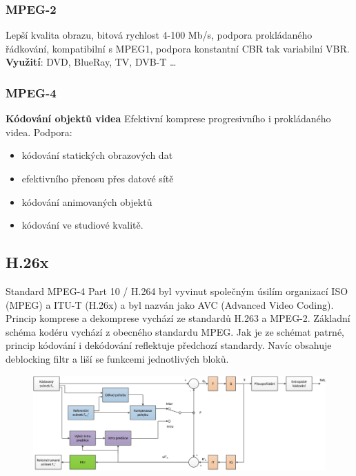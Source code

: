 \subsubsection{MPEG-2}
Lepší kvalita obrazu, bitová rychlost 4-100 Mb/s, podpora prokládaného řádkování, kompatibilní s MPEG1, podpora konstantní CBR tak variabilní VBR. \textbf{Využití}: DVD, BlueRay, TV, DVB-T …

\subsubsection{MPEG-4}
\textbf{Kódování objektů videa}
Efektivní komprese progresivního i prokládaného videa.
Podpora: \vspace{-4mm}
\begin{itemize}
    \item kódování statických obrazových dat
    \item efektivního přenosu přes datové sítě 
    \item kódování animovaných objektů 
    \item kódování ve studiové kvalitě.
\end{itemize}

\subsection{H.26x}

Standard MPEG-4 Part 10 / H.264 byl vyvinut společným úsilím organizací ISO (MPEG)
a ITU-T (H.26x) a byl nazván jako AVC (Advanced Video Coding). Princip komprese a
dekomprese vychází ze standardů H.263 a MPEG-2. Základní schéma kodéru vychází z obecného standardu MPEG. Jak je ze schémat patrné, princip kódování i dekódování reflektuje předchozí standardy. Navíc obsahuje deblocking filtr a liší se funkcemi jednotlivých bloků.

\begin{figure}[ht]
    \centering
    \includegraphics[width=1\linewidth]{images/h264.png}
\end{figure}
\FloatBarrier

